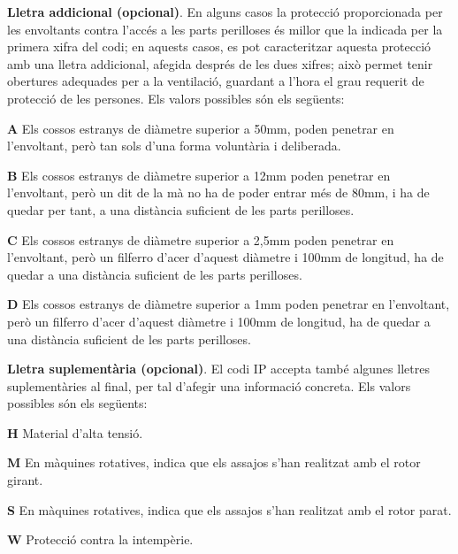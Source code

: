 \textbf{Lletra addicional (opcional)}. En alguns casos la protecci\'{o}
proporcionada per les envoltants contra l'acc\'{e}s a les parts
perilloses \'{e}s millor que la indicada per la primera xifra del codi;
en aquests casos, es pot caracteritzar aquesta protecci\'{o} amb una
lletra addicional, afegida despr\'{e}s de les dues xifres; aix\`{o} permet
tenir obertures adequades per a la ventilaci\'{o},  guardant a l'hora el
grau requerit de protecci\'{o} de les persones. Els valors possibles s\'{o}n
els seg\"{u}ents:
\begin{list}{}
   {\setlength{\labelwidth}{10mm} \setlength{\leftmargin}{10mm} \setlength{\labelsep}{2mm}}
   \item[\textbf{A}] Els  cossos estranys de di\`{a}metre superior a
   50\unit{mm},
    poden penetrar en l'envoltant, per\`{o} tan sols d'una forma volunt\`{a}ria i deliberada.
   \item[\textbf{B}] Els  cossos estranys de di\`{a}metre superior a 12\unit{mm}
    poden penetrar en l'envoltant, per\`{o} un dit de la m\`{a} no ha de poder entrar m\'{e}s de 80\unit{mm}, i
    ha de quedar per tant, a una dist\`{a}ncia    suficient de les parts perilloses.
   \item[\textbf{C}] Els  cossos estranys de di\`{a}metre superior a 2,5\unit{mm}
   poden penetrar en l'envoltant, per\`{o} un filferro d'acer d'aquest di\`{a}metre i 100\unit{mm}
   de longitud, ha de quedar a una dist\`{a}ncia suficient de les parts perilloses.
   \item[\textbf{D}] Els  cossos estranys de di\`{a}metre superior a 1\unit{mm}
   poden penetrar en l'envoltant, per\`{o} un filferro d'acer d'aquest di\`{a}metre i 100\unit{mm}
   de longitud, ha de quedar a una dist\`{a}ncia suficient de les parts perilloses.
\end{list}

\textbf{Lletra suplement\`{a}ria (opcional)}. El codi \textsf{IP} accepta tamb\'{e} algunes
lletres suplement\`{a}ries al final, per tal d'afegir una informaci\'{o} concreta. Els valors
possibles s\'{o}n els seg\"{u}ents:
\begin{list}{}
   {\setlength{\labelwidth}{10mm} \setlength{\leftmargin}{10mm} \setlength{\labelsep}{2mm}}
   \item[\textbf{H}] Material d'alta tensi\'{o}.
   \item[\textbf{M}] En m\`{a}quines rotatives, indica que els assajos s'han realitzat amb el
    rotor girant.
   \item[\textbf{S}] En m\`{a}quines rotatives, indica que els assajos s'han realitzat amb el
    rotor parat.
   \item[\textbf{W}] Protecci\'{o} contra la intemp\`{e}rie.
\end{list}


